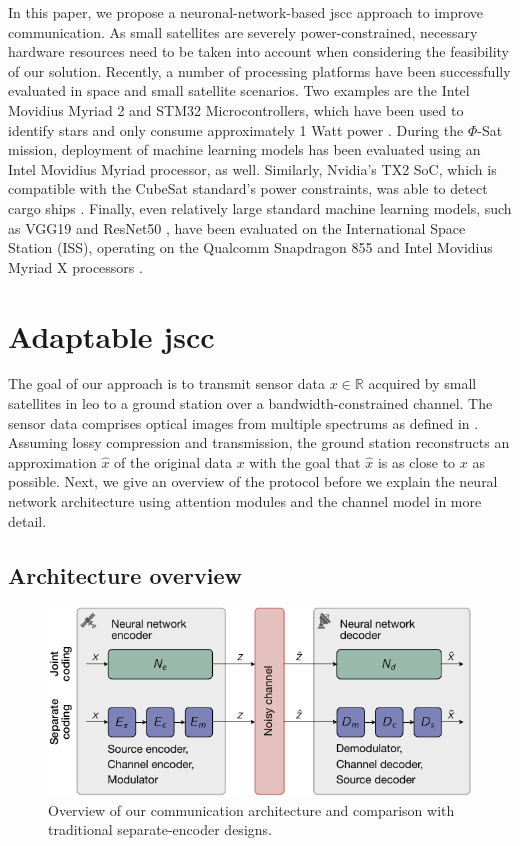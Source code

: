 \documentclass[conference]{IEEEtran}
\begin{document}
In this paper, we propose a neuronal-network-based \ac{jscc} approach to improve communication.
As small satellites are severely power-constrained, necessary hardware resources need to be taken into account when considering the feasibility of our solution.
Recently, a number of processing platforms have been successfully evaluated  in space and small satellite scenarios.
Two examples are the Intel Movidius Myriad 2 and STM32 Microcontrollers, which have been used to identify stars and only consume approximately 1 Watt power \cite{8556744}.
During the $\Phi$-Sat mission, deployment of machine learning models has been evaluated using an Intel Movidius Myriad processor, as well.
Similarly, Nvidia's TX2 SoC, which is compatible with the CubeSat standard's power constraints, was able to detect cargo ships \cite{8556744}.
Finally, even relatively large standard machine learning models, such as VGG19 \cite{DBLP:journals/corr/SimonyanZ14a} and ResNet50 \cite{7780459}, have been evaluated on the International Space Station (ISS), operating on the Qualcomm Snapdragon 855 and Intel Movidius Myriad X processors \cite{9884906}.


\section{Adaptable \ac{jscc}}
\label{sec:our_approach}

The goal of our approach is to transmit sensor data $x \in \mathbb{R}$ acquired by small satellites in \ac{leo} to a ground station over a bandwidth-constrained channel.
The sensor data comprises optical images from multiple spectrums as defined in .
Assuming lossy compression and transmission, the ground station reconstructs an approximation $\hat{x}$ of the original data $x$ with the goal that $\hat{x}$ is as close to $x$ as possible.
Next, we give an overview of the protocol before we explain the neural network architecture using attention modules and the channel model in more detail.

\subsection{Architecture overview}

\begin{figure}
  \includegraphics[width=\linewidth]{figures/coding-decoding}

  \caption{Overview of our communication architecture and comparison with traditional separate-encoder designs.}
  \label{fig:overview}
\end{figure}
\end{document}
